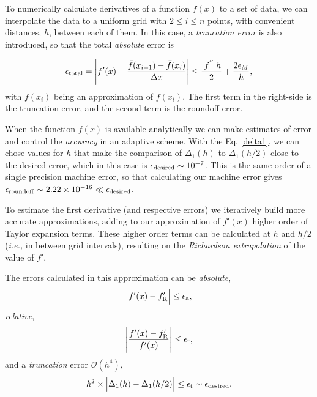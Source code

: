 \documentclass[11pt]{article}
\newcommand{\ie}{{\it i.e., }}
\begin{document}
\quad

To numerically calculate derivatives of a function $f(x)$ to a set of data, we can interpolate the data to a uniform grid with $2 \leq i \leq n$ points, with convenient distances, $h$,  between each of them.   In this case, a {\it truncation error} is also introduced, so that the total {\it absolute} error is

\begin{equation}
\epsilon_{\rm total} = \Bigg | f'(x) - \frac{\bar{f}(x_{i+1}) - \bar{f}(x_{i})}{\Delta x} \Bigg| \leq \frac{|f^{''}|h}{2} + \frac{2\epsilon_M}{h},
\label{err1}
\end{equation}
with $\bar{f}(x_{i})$ being an approximation of ${f}(x_{i})$. The first term in the right-side is the  truncation error, and the second term is the  roundoff error. 

\quad

When the function $f(x)$ is available analytically we can make estimates of error and control the {\it accuracy} in an adaptive scheme. With the Eq. \ref{delta1}, we can chose  values for $h$ that make the comparison of $\Delta_1(h)$ to $\Delta_1(h/2)$ close to the desired error, which in this case is  $\epsilon_{\rm desired} \sim 10^{-7}$. This is the same order of  a single precision machine error, so that calculating our machine error gives $\epsilon_{\rm roundoff } \sim 2.22 \times 10^{-16} \ll \epsilon_{\rm desired}$.

\quad

To estimate the first derivative (and respective errors) we iteratively build  more accurate approximations, adding to our approximation of $f'(x)$ higher order of Taylor expansion terms. These higher order terms can be calculated at $h$ and $h/2$ (\ie in between grid intervals), resulting on the {\it Richardson extrapolation} of the value of $f'$,\\

\centerline{}

\quad

The errors calculated in this approximation can be {\it absolute},
$$\Big |f'(x)-f'_{\rm R} \Big | \leq \epsilon_{\rm a}, $$ {\it relative},
$$\Bigg |\frac{f'(x)-f'_{\rm R}}{f'(x)} \Bigg | \leq \epsilon_{\rm r}, $$
and a {\it truncation} error $\mathcal{O}(h^4)$,
$$h^2 \times  \Big | \Delta_1(h) - \Delta_1(h/2)   \Big | \leq \epsilon_{\rm t}  \sim \epsilon_{\rm desired}.$$
\end{document}

